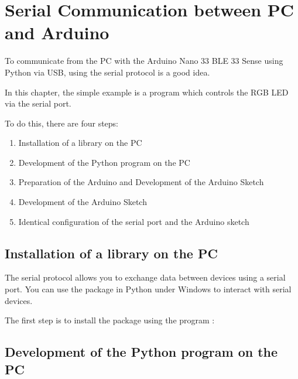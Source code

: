 %
%
%



\chapter{Serial Communication between PC and Arduino}



To communicate from the PC with the Arduino Nano 33 BLE 33 Sense using Python via USB, using the serial protocol is a good idea. 

In this chapter, the simple example is a program which controls the RGB LED via the serial port.


To do this, there are four steps:

\begin{enumerate}
  \item Installation of a library on the PC
  \item Development of the Python program on the PC
  \item Preparation of the Arduino and Development of the Arduino Sketch
  \item Development of the Arduino Sketch
  \item Identical configuration of the serial port and the Arduino sketch
\end{enumerate}

\section{Installation of a library on the PC}


The serial protocol allows you to exchange data between devices using a serial port. You can use the package   in Python under Windows to interact with serial devices.

The first step is to  install the  package  using the program :

\medskip




\section{Development of the Python program on the PC}

